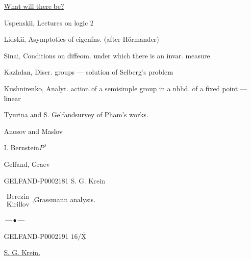 \underline{What will there be?}



Uspenskii, Lectures on logic 2



Lidskii, Asymptotics of eigenfns. (after Hörmander)



Sinai, Conditions on diffeom. under which there is an invar. measure



Kazhdan, Discr. groups --- solution of Selberg's problem



Kushnirenko, Analyt. action of a semisimple group in a nbhd. of a fixed point --- linear







Tyurina and S. Gelfand\quad survey of Pham's works.

Anosov and Maslov

I. Bernstein\quad $P^{\lambda}$

Gelfand, Graev

\begin{GelfandAdjacentEvidence}{GELFAND-P000218}{1}
S. G. Krein\quad {}
\end{GelfandAdjacentEvidence}


$\begin{gathered}\text{Berezin}\\\text{Kirillov}\end{gathered}$,\quad Grassmann analysis.

\begin{center}
$\text{—}\,\bullet\,\text{—}$
\end{center}





\begin{GelfandAdjacentEvidence}{GELFAND-P000219}{1}
$16/\underline{\overline{\mathrm{X}}}$\quad {}
\end{GelfandAdjacentEvidence}
\quad \underline{S. G. Krein.}

